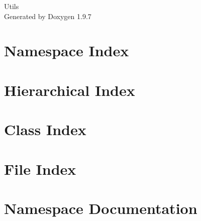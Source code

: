 \documentclass[twoside]{book}
\newcommand{\+}{\discretionary{\mbox{\scriptsize$\hookleftarrow$}}{}{}}
\newcommand{\clearemptydoublepage}{%
    \newpage{\pagestyle{empty}\cleardoublepage}%
  }
\begin{document}
  \raggedbottom
    \hypersetup{pageanchor=false,
                bookmarksnumbered=true,
                pdfencoding=unicode
               }
  \begin{titlepage}
  \vspace*{7cm}
  \begin{center}%
  {\Large Utils}\\
  \vspace*{1cm}
  {\large Generated by Doxygen 1.9.7}\\
  \end{center}
  \end{titlepage}
  \clearemptydoublepage
  \tableofcontents
  \clearemptydoublepage
  \hypersetup{pageanchor=true}

\chapter{Namespace Index}

\chapter{Hierarchical Index}

\chapter{Class Index}

\chapter{File Index}

\chapter{Namespace Documentation}











\end{document}
